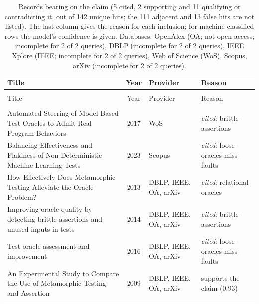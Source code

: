 
\begingroup\footnotesize
\begin{longtable}{@{}%
  >{\raggedright\arraybackslash}p{}c%
  >{\raggedright\arraybackslash}p{}%
  >{\raggedright\arraybackslash}p{}@{}}
\caption{Records bearing on the claim (5 cited, 2 supporting and 11 qualifying or contradicting it, out of 142 unique hits; the 111 adjacent and 13 false hits are not listed). The last column gives the reason for each inclusion; for machine-classified rows the model's confidence is given. Databases: OpenAlex (OA; not open access; incomplete for 2 of 2 queries), DBLP (incomplete for 2 of 2 queries), IEEE Xplore (IEEE; incomplete for 2 of 2 queries), Web of Science (WoS), Scopus, arXiv (incomplete for 2 of 2 queries).}\label{tab:t-invariant-assertions}\\
\toprule
Title & Year & Provider & Reason \\
\midrule
\endfirsthead
\multicolumn{4}{@{}l}{\emph{\tablename~\thetable{} (cont.)}}\\
\toprule
Title & Year & Provider & Reason \\
\midrule
\endhead
\midrule \multicolumn{4}{r@{}}{\emph{continued on next page}}\\
\endfoot
\bottomrule
\endlastfoot
Automated Steering of Model-Based Test Oracles to Admit Real Program Behaviors & 2017 & WoS & \emph{cited}: brittle-assertions \\
Balancing Effectiveness and Flakiness of Non-Deterministic Machine Learning Tests & 2023 & Scopus & \emph{cited}: loose-oracles-miss-faults \\
How Effectively Does Metamorphic Testing Alleviate the Oracle Problem? & 2013 & DBLP, IEEE, OA, arXiv & \emph{cited}: relational-oracles \\
Improving oracle quality by detecting brittle assertions and unused inputs in tests & 2014 & DBLP, IEEE, OA, arXiv & \emph{cited}: brittle-assertions \\
Test oracle assessment and improvement & 2016 & DBLP, IEEE, OA, arXiv & \emph{cited}: loose-oracles-miss-faults \\
An Experimental Study to Compare the Use of Metamorphic Testing and Assertion & 2009 & DBLP, IEEE, OA, arXiv & supports the claim (0.93) \\

\end{longtable}
